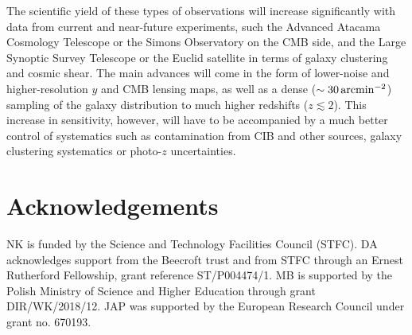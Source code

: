 \documentclass[useAMS,usenatbib]{mn2e}
\begin{document}
  The scientific yield of these types of observations will increase significantly with data from current and near-future experiments, such the Advanced Atacama Cosmology Telescope \citep{2016SPIE.9910E..14D} or the Simons Observatory \citep{2019JCAP...02..056A} on the CMB side, and the Large Synoptic Survey Telescope \citep{2009arXiv0912.0201L} or the Euclid satellite \citep{2011arXiv1110.3193L} in terms of galaxy clustering and cosmic shear. The main advances will come in the form of lower-noise and higher-resolution $y$ and CMB lensing maps, as well as a dense ($\sim30\,{\rm arcmin}^{-2}$) sampling of the galaxy distribution to much higher redshifts ($z\lesssim2$). This increase in sensitivity, however, will have to be accompanied by a much better control of systematics such as contamination from CIB and other sources, galaxy clustering systematics or photo-$z$ uncertainties.


\section*{Acknowledgements}
  NK is funded by the Science and Technology Facilities Council (STFC). DA acknowledges support from the Beecroft trust and from STFC through an Ernest Rutherford Fellowship, grant reference ST/P004474/1. MB is supported by the Polish Ministry of Science and Higher Education through grant DIR/WK/2018/12. JAP was supported by the European Research Council under grant no. 670193.
  
\setlength{\bibhang}{2.0em}
\setlength{}

\end{document}
